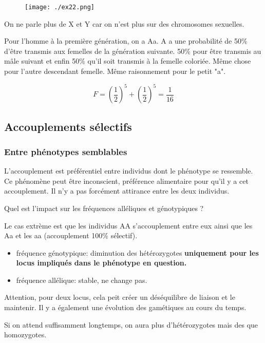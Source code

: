 \documentclass{article}
\begin{document}
\pagebreak

\begin{figure}[H]
\texttt{[image: ./ex22.png]}
\end{figure}

On ne parle plus de X et Y car on n'est plus sur des chromosomes sexuelles.

Pour l'homme à la première génération, on a Aa. A a une probabilité de 50\% d'être transmis aux femelles de la génération suivante. 50\% pour être transmis au mâle suivant et enfin 50\% qu'il soit transmis à la femelle coloriée. Même chose pour l'autre descendant femelle. Même raisonnement pour le petit "a". 

\begin{equation}
F = (\frac{1}{2})^5 + (\frac{1}{2})^5 = \frac{1}{16}
\end{equation}

\subsection{Accouplements sélectifs}

\subsubsection{Entre phénotypes semblables}
L'accouplement est préférentiel entre individus dont le phénotype se ressemble. Ce phénomène peut être inconscient, préférence alimentaire pour qu'il y a cet accouplement. Il n'y a pas forcément attirance entre les deux individus.

Quel est l'impact sur les fréquences alléliques et génotypiques ? 

Le cas extrème est que les individus AA s'accouplement entre eux ainsi que les Aa et les aa (accouplement 100\% sélectif).

\begin{itemize}
\item fréquence génotypique: diminution des hétérozygotes \textbf{uniquement pour les locus impliqués dans le phénotype en question.}
\item fréquence allélique: stable, ne change pas.
\end{itemize}

Attention, pour deux locus, cela peit créer un déséquilibre de liaison et le maintenir. Il y a également une évolution des gamétiques au cours du temps.

Si on attend suffisamment longtemps, on aura plus d'hétérozygotes mais des que homozygotes.
\end{document}
